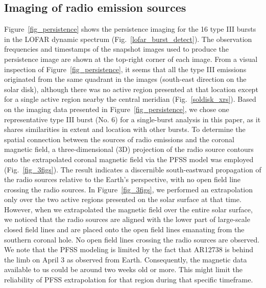 \subsection{Imaging of radio emission sources}
Figure~\ref{fig_persistence} shows the persistence imaging for the 16 type III bursts in the LOFAR dynamic spectrum (Fig.~\ref{lofar_burst_detect}). The observation frequencies and timestamps of the snapshot images used to produce the persistence image are shown at the top-right corner of each image.
From a visual inspection of Figure~\ref{fig_persistence}, it seems that all the type III emissions originated from the same quadrant in the images (south-east direction on the solar disk), although there was no active region presented at that location except for a single active region nearby the central meridian (Fig.~\ref{soldisk_xrs}).
Based on the imaging data presented in Figure~\ref{fig_persistence}, we chose one representative type III burst (No. 6) for a single-burst analysis in this paper, as it shares similarities in extent and location with other bursts.
To determine the spatial connection between the sources of radio emissions and the coronal magnetic field, a three-dimensional (3D) projection of the radio source contours onto the extrapolated coronal magnetic field via the PFSS model was employed (Fig.~\ref{fig_3figs}). The result indicates a discernible south-eastward propagation of the radio sources relative to the Earth's perspective, with no open field line crossing the radio sources. In Figure~\ref{fig_3figs}, we performed an extrapolation only over the two active regions presented on the solar surface at that time. However, when we extrapolated the magnetic field over the entire solar surface, we noticed that the radio sources are aligned with the lower part of large-scale closed field lines and are placed onto the open field lines emanating from the southern coronal hole. No open field lines crossing the radio sources are observed.
We note that the PFSS modeling is limited by the fact that AR12738 is behind the limb on April 3 as observed from Earth. Consequently, the magnetic data available to us could be around two weeks old or more. This might limit the reliability of PFSS extrapolation for that region during that specific timeframe.

